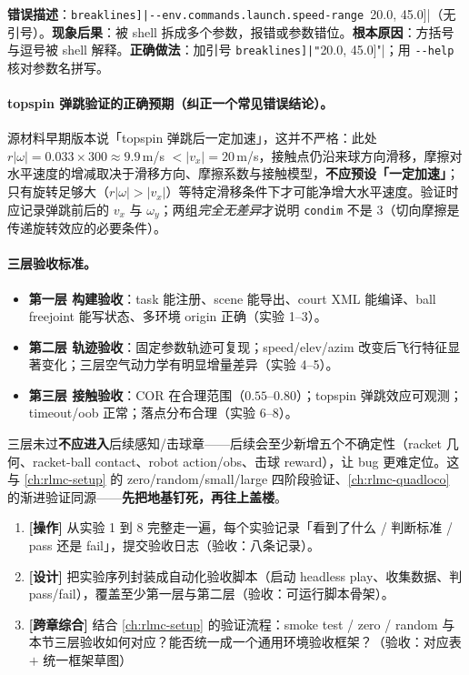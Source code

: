 \begin{pitfall}
\textbf{错误描述}：\Verb[breaklines]|--env.commands.launch.speed-range [20.0, 45.0]|（无引号）。\textbf{现象后果}：被 shell 拆成多个参数，报错或参数错位。\textbf{根本原因}：方括号与逗号被 shell 解释。\textbf{正确做法}：加引号 \Verb[breaklines]|"[20.0, 45.0]"|；用 \verb|--help| 核对参数名拼写。
\end{pitfall}

\paragraph{topspin 弹跳验证的正确预期（纠正一个常见错误结论）。}源材料早期版本说「topspin 弹跳后一定加速」，这并不严格：此处 $r|\omega|=0.033\times300\approx9.9$\,m/s $<|v_x|=20$\,m/s，接触点仍沿来球方向滑移，摩擦对水平速度的增减取决于滑移方向、摩擦系数与接触模型，\textbf{不应预设「一定加速」}；只有旋转足够大（$r|\omega|>|v_x|$）等特定滑移条件下才可能净增大水平速度。验证时应记录弹跳前后的 $v_x$ 与 $\omega_y$；两组\emph{完全无差异}才说明 \verb|condim| 不是 $3$（切向摩擦是传递旋转效应的必要条件）。

\paragraph{三层验收标准。}
\begin{itemize}
  \item \textbf{第一层 构建验收}：task 能注册、scene 能导出、court XML 能编译、ball freejoint 能写状态、多环境 origin 正确（实验 1--3）。
  \item \textbf{第二层 轨迹验收}：固定参数轨迹可复现；speed/elev/azim 改变后飞行特征显著变化；三层空气动力学有明显增量差异（实验 4--5）。
  \item \textbf{第三层 接触验收}：COR 在合理范围（$0.55$--$0.80$）；topspin 弹跳效应可观测；timeout/oob 正常；落点分布合理（实验 6--8）。
\end{itemize}
三层未过\textbf{不应进入}后续感知/击球章——后续会至少新增五个不确定性（racket 几何、racket-ball contact、robot action/obs、击球 reward），让 bug 更难定位。这与 \cref{ch:rlmc-setup} 的 zero/random/small/large 四阶段验证、\cref{ch:rlmc-quadloco} 的渐进验证同源——\textbf{先把地基钉死，再往上盖楼}。

\begin{practice}[本节动手任务]
\begin{enumerate}
  \item \textbf{[操作]} 从实验 1 到 8 完整走一遍，每个实验记录「看到了什么 / 判断标准 / pass 还是 fail」，提交验收日志（验收：八条记录）。
  \item \textbf{[设计]} 把实验序列封装成自动化验收脚本（启动 headless play、收集数据、判 pass/fail），覆盖至少第一层与第二层（验收：可运行脚本骨架）。
  \item \textbf{[跨章综合]} 结合 \cref{ch:rlmc-setup} 的验证流程：smoke test / zero / random 与本节三层验收如何对应？能否统一成一个通用环境验收框架？（验收：对应表 $+$ 统一框架草图）
\end{enumerate}
\end{practice}


